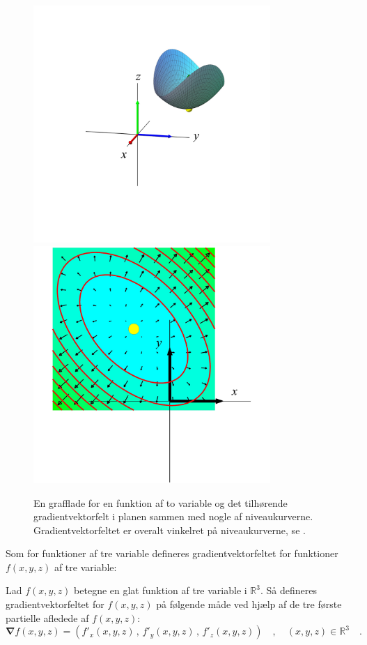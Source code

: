 \begin{figure}[h]
\centerline{\includegraphics[height=90mm]{FIGS/plotVar2Fig4}\,\,\includegraphics[height=90mm]{FIGS/plotGrad4}}
\begin{center}
\caption{\small{En grafflade for en funktion af to variable og det tilhørende gradientvektorfelt i planen sammen med nogle af niveaukurverne. Gradientvektorfeltet er overalt vinkelret på niveaukurverne, se .}}
\label{figGradFelt}
\end{center}
\end{figure}

Som for funktioner af tre variable defineres gradientvektorfeltet for funktioner $f(x,y, z)$  af tre variable:


\begin{definition} \label{defGradFelt3D}
Lad $f(x,y,z)$ betegne en glat funktion af tre variable i $\mathbb{R}^{3}$.
Så defineres gradientvektorfeltet for $f(x,y,z)$ på følgende måde ved hjælp af de tre første partielle afledede af $f(x,y,z)$:
\begin{equation}
\bm{\nabla}f(x,y,z) = \left(f'_{x}(x,y,z)\, , \, f'_{y}(x,y,z) \, , \, f'_{z}(x,y,z)\right) \quad , \quad (x,y,z) \in \mathbb{R}^{3} \quad .
\end{equation}
\end{definition}

